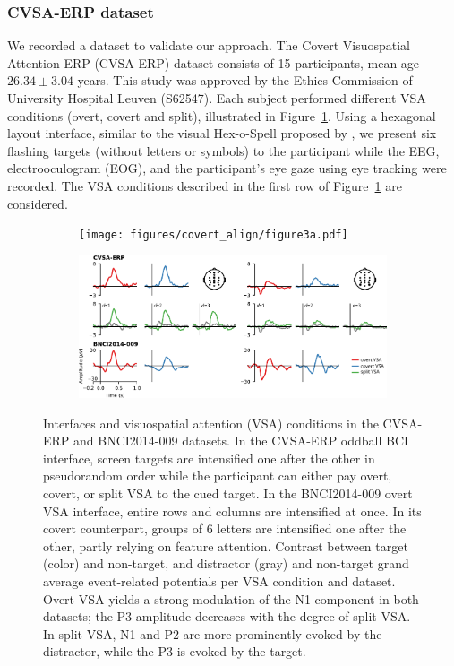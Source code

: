 \subsubsection{CVSA-ERP dataset}

We recorded a dataset to validate our approach.
The Covert Visuospatial Attention ERP (CVSA-ERP) dataset
consists of 15 participants, mean age $26.34\pm3.04$ years.
This study was approved by the Ethics Commission of University Hospital Leuven
(S62547).
Each subject performed different VSA conditions (overt, covert and split),
illustrated in Figure~\ref{fig:interface}.
Using a hexagonal layout interface, similar to the visual Hex-o-Spell proposed
by \cite{Treder2010}, we present six flashing targets (without letters or
symbols) to the participant while the EEG, electrooculogram (EOG), and the
participant's eye gaze using eye tracking were recorded.
The VSA conditions described in the first row of Figure~\ref{fig:interface} are
considered.
\begin{figure}
  \bigskip
	\begin{subfigure}{\linewidth}
		\caption{}
		\label{fig:interface}
		\texttt{[image: figures/covert\_align/figure3a.pdf]}
	\end{subfigure}

	\bigskip
	\bigskip
	\begin{subfigure}{\linewidth}
		\caption{}
		\label{fig:erps}
		\includegraphics[width=\linewidth]{figures/covert_align/figure3b.pdf}
	\end{subfigure}%

	\caption{
		 Interfaces and visuospatial attention (VSA)
    conditions in the CVSA-ERP and BNCI2014-009 datasets.
		In the CVSA-ERP oddball BCI interface, screen targets are intensified one after
    the other in pseudorandom order while the participant can either pay overt,
    covert, or split VSA to the cued target.
		In the BNCI2014-009 overt VSA interface, entire rows and columns are
		intensified at once. In its covert counterpart,
		groups of 6 letters are intensified one after the other, partly relying on
    feature attention.
		 Contrast between target (color) and non-target, and
    distractor (gray) and non-target grand average event-related potentials per VSA condition and dataset.
    Overt VSA yields a strong modulation of the N1 component in both datasets;
    the P3 amplitude decreases with the degree of split VSA.
    In split VSA, N1 and P2 are more prominently evoked by the distractor,
    while the P3 is evoked by the target.
	}
\end{figure}


